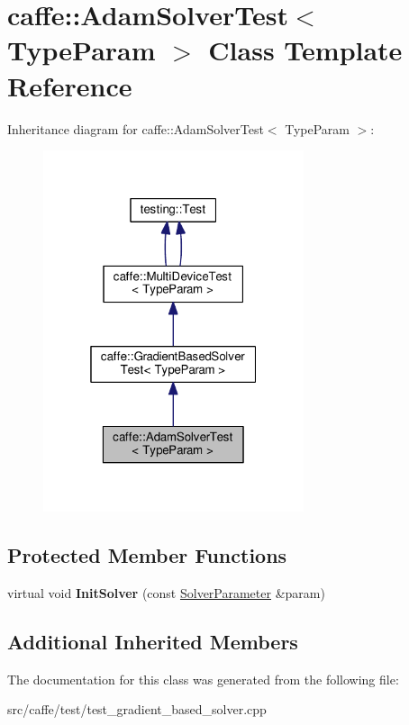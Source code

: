 \hypertarget{classcaffe_1_1_adam_solver_test}{}\section{caffe\+:\+:Adam\+Solver\+Test$<$ Type\+Param $>$ Class Template Reference}
\label{classcaffe_1_1_adam_solver_test}


Inheritance diagram for caffe\+:\+:Adam\+Solver\+Test$<$ Type\+Param $>$\+:
\nopagebreak
\begin{figure}[H]
\begin{center}
\leavevmode
\includegraphics[width=217pt]{classcaffe_1_1_adam_solver_test__inherit__graph}
\end{center}
\end{figure}
\subsection*{Protected Member Functions}
\begin{DoxyCompactItemize}
\item 
\mbox{\label{classcaffe_1_1_adam_solver_test_a9bf49f7c9031b25a5b6656879016bde9}} 
virtual void {\bfseries Init\+Solver} (const \mbox{\hyperlink{classcaffe_1_1_solver_parameter}{Solver\+Parameter}} \&param)
\end{DoxyCompactItemize}
\subsection*{Additional Inherited Members}


The documentation for this class was generated from the following file\+:\begin{DoxyCompactItemize}
\item 
src/caffe/test/test\+\_\+gradient\+\_\+based\+\_\+solver.\+cpp\end{DoxyCompactItemize}
